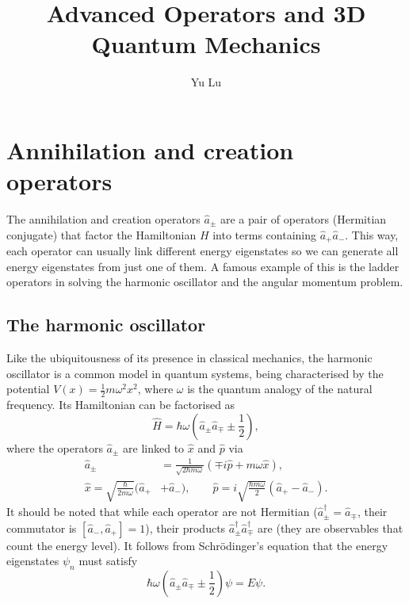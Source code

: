 \documentclass{article}
\title{Advanced Operators and 3D Quantum Mechanics}
\author{Yu Lu}
\theoremstyle{nonumberplain}
\begin{document}
\maketitle
\section{Annihilation and creation operators}
The annihilation and creation operators $\hat{a}_{\pm}$ are a pair of operators (Hermitian conjugate) that factor the Hamiltonian $H$ into terms containing $\hat{a}_{+} \hat{a}_{-}$. This way, each operator can usually link different energy eigenstates so we can generate all energy eigenstates from just one of them. A famous example of this is the ladder operators in solving the harmonic oscillator and the angular momentum problem. 
\subsection{The harmonic oscillator}
Like the ubiquitousness of its presence in classical mechanics, the harmonic oscillator is a common model in quantum systems, being characterised by the potential $V(x) = \frac{1}{2}m \omega ^2 x^2$, where $\omega $ is the quantum analogy of the natural frequency. Its Hamiltonian can be factorised as 
\[
    \hat{H} = \hbar \omega \left(
        \hat{a}_{\pm} \hat{a}_{\mp} \pm \frac{1}{2}
    \right),
\]
where the operators $\hat{a} _{\pm}$ are linked to $\hat{x} $ and $\hat{p} $ via 
\[
    \boxed{
        \begin{aligned}
            \hat{a} _{\pm} &= \frac{1}{\sqrt{2 \hbar m \omega } } (\mp i \hat{p} + m \omega \hat{x} ), \\
            \hat{x} = \sqrt{\frac{\hbar}{2 m \omega }} (\hat{a} _+ &+ \hat{a} _-),
            \qquad  
            \hat{p} = i \sqrt{\frac{\hbar  m \omega }{2}} (\hat{a} _+ - \hat{a} _-).
        \end{aligned}
    }
\]
It should be noted that while each operator are not Hermitian (${\hat{a}^{\dagger}_\pm}=\hat{a}_\mp$, their commutator is $[\hat{a}_-, \hat{a}_+] = 1$), their products $\hat{a}^{\dagger}_{\pm}\hat{a}^{\dagger}_{\mp}$ are (they are observables that count the energy level). It follows from Schrödinger's equation that the energy eigenstates $\psi_n$ must satisfy 
\begin{equation} \label{eq:harmonic-oscil-SE}
    \hbar \omega \left(
        \hat{a}_{\pm} \hat{a}_{\mp} \pm \frac{1}{2}
    \right) \psi 
    = E \psi.  
\end{equation}
\end{document}
